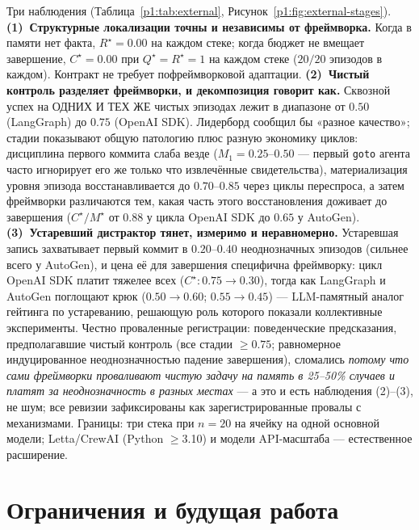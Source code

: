 \documentclass{article}
\newcommand{\method}[1]{\texttt{#1}}
\begin{document}
Три наблюдения (Таблица~\ref{p1:tab:external},
Рисунок~\ref{p1:fig:external-stages}). \textbf{(1)~Структурные
локализации точны и независимы от фреймворка.} Когда в памяти
нет факта, $R^\star{=}0.00$ на каждом стеке; когда бюджет
не вмещает завершение, $C^\star{=}0.00$ при $Q^\star{=}R^\star{=}1$ на
каждом стеке ($20/20$ эпизодов в каждом). Контракт не требует
пофреймворковой адаптации. \textbf{(2)~Чистый контроль разделяет
фреймворки, и декомпозиция говорит как.} Сквозной успех на
ОДНИХ И ТЕХ ЖЕ чистых эпизодах лежит в диапазоне от $0.50$ (LangGraph) до $0.75$ (OpenAI SDK).
Лидерборд сообщил бы «разное качество»; стадии показывают
общую патологию плюс разную экономику циклов: дисциплина первого
коммита слаба везде ($M_1{=}0.25$--$0.50$ --- первый
\method{goto} агента часто игнорирует его же только что извлечённые
свидетельства), материализация уровня эпизода восстанавливается до $0.70$--$0.85$
через циклы переспроса, а затем фреймворки различаются тем, какая часть
этого восстановления доживает до завершения ($C^\star/M^\star$ от $0.88$
у цикла OpenAI SDK до $0.65$ у AutoGen). \textbf{(3)~Устаревший
дистрактор тянет, измеримо и неравномерно.} Устаревшая запись
захватывает первый коммит в $0.20$--$0.40$ неоднозначных эпизодов
(сильнее всего у AutoGen), и цена её для завершения
специфична фреймворку: цикл OpenAI SDK платит тяжелее всех
($C^\star:0.75\to0.30$), тогда как LangGraph и AutoGen поглощают крюк
($0.50\to0.60$; $0.55\to0.45$) --- LLM-памятный аналог
гейтинга по устареванию, решающую роль которого показали коллективные
эксперименты. Честно проваленные регистрации: поведенческие предсказания,
предполагавшие чистый контроль (все стадии $\ge 0.75$; равномерное
индуцированное неоднозначностью падение завершения), сломались \emph{потому что сами фреймворки
проваливают чистую задачу на память в 25--50\% случаев и платят за
неоднозначность в разных местах} --- а это и есть наблюдения (2)--(3), не
шум; все ревизии зафиксированы как зарегистрированные провалы с
механизмами. Границы: три стека при $n{=}20$ на ячейку на одной основной
модели; Letta/CrewAI (Python $\ge$3.10) и модели API-масштаба --- естественное
расширение.

\section{Ограничения и будущая работа}
\label{p1:sec:limitations}
\end{document}
